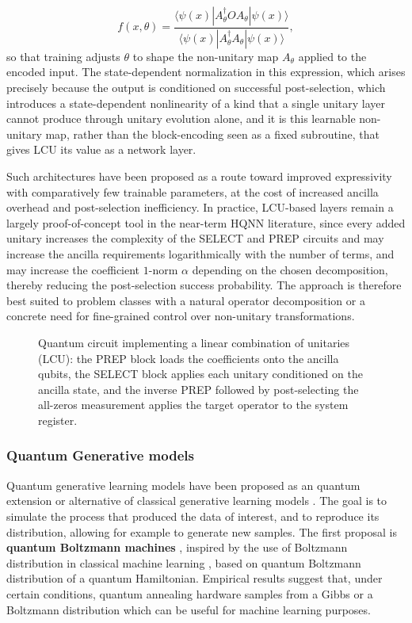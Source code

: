 \documentclass[aps,10pt,groupedaddress,prx,superscriptaddress,twocolumn,balancelastpage, tightenlines]{revtex4-2}
\theoremstyle{plain}  %
\begin{document}
\begin{equation}
    f(x,\theta) = \frac{\langle\psi(x)|A_{\theta}^{\dagger} O A_{\theta}|\psi(x)\rangle}{\langle\psi(x)|A_{\theta}^{\dagger} A_{\theta}|\psi(x)\rangle},
\end{equation} 
so that training adjusts $\theta$ to shape the non-unitary map $A_{\theta}$ applied to the encoded input. The state-dependent normalization in this expression, which arises precisely because the output is conditioned on successful post-selection, which introduces a state-dependent nonlinearity of a kind that a single unitary layer cannot produce through unitary evolution alone, and it is this learnable non-unitary map, rather than the block-encoding seen as a fixed subroutine, that gives LCU its value as a network layer.

Such architectures have been proposed as a route toward improved expressivity with comparatively few trainable parameters, at the cost of increased ancilla overhead and post-selection inefficiency. In practice, LCU-based layers remain a largely proof-of-concept tool in the near-term \gls{HQNN} literature, since every added unitary increases the complexity of the SELECT and PREP circuits and may increase the ancilla requirements logarithmically with the number of terms, and may increase the coefficient $1$-norm $\alpha$ depending on the chosen decomposition, thereby reducing the post-selection success probability. The approach is therefore best suited to problem classes with a natural operator decomposition or a concrete need for fine-grained control over non-unitary transformations.

\begin{figure}[htb]
  \centering
  
\caption{Quantum circuit implementing a linear combination of unitaries (LCU): the PREP block loads the coefficients onto the ancilla qubits, the SELECT block applies each unitary conditioned on the ancilla state, and the inverse PREP followed by post-selecting the all-zeros measurement applies the target operator to the system register.}
  \label{fig:lcu}
\end{figure}

\subsubsection{Quantum Generative models}\label{subsec:QGAN}

Quantum generative learning models have been proposed as an quantum extension or alternative of classical generative learning models \cite{tian_recent_2023}. The goal is to simulate the process that produced the data of interest, and to reproduce its distribution, allowing for example to generate new samples. The first proposal is \textbf{quantum Boltzmann machines} \cite{amin_quantum_2018}, inspired by the use of Boltzmann distribution in classical machine learning \cite{cheng_information_2018}, based on quantum Boltzmann distribution of a quantum Hamiltonian. Empirical results suggest that, under certain conditions, quantum annealing hardware samples from a Gibbs or a Boltzmann distribution \cite{Benedetti2018Unsupervised, amin_quantum_2018, benedetti_estimation_2016, amin_searching_2015} which can be useful for machine learning purposes. 
\end{document}
